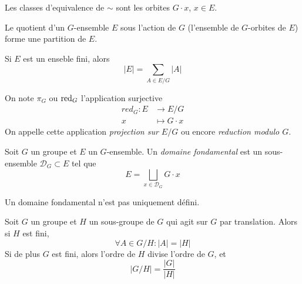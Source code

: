 \begin{remark}
	Les classes d'equivalence de $\sim$ sont les orbites $G \cdot x$, $x \in E$.
\end{remark}

\begin{corollary}
	Le quotient d'un $G$-ensemble $E$ sous l'action de $G$
	(l'ensemble de $G$-orbites de $E$) forme une partition de $E$.
\end{corollary}

\begin{corollary}
	Si $E$ est un enseble fini, alors
	\begin{equation*}
		|E| = \sum_{A \in E/G}|A|
	\end{equation*}
\end{corollary}

\begin{definition}
	On note $\pi_G$ ou $\operatorname{red}_G$ l'application surjective
	\begin{align*}
		red_G : E &\to E/G \\
		x &\mapsto G \cdot x
	\end{align*}
	On appelle cette application \emph{projection sur $E/G$} ou encore
	\emph{reduction modulo $G$}.
\end{definition}

\begin{definition}
	Soit $G$ un groupe et $E$ un $G$-ensemble.
	Un \emph{domaine fondamental} est un sous-ensemble
	$\mathcal{D}_G \subset E$ tel que
	\begin{equation*}
		E = \bigsqcup_{x \in \mathcal{D}_G} G \cdot x
	\end{equation*}
\end{definition}

\begin{remark}
	Un domaine fondamental n'est pas uniquement défini.
\end{remark}

\begin{theorem}
	Soit $G$ un groupe et $H$ un sous-groupe de $G$
	qui agit sur $G$ par translation. Alors si $H$ est fini,
	\begin{equation*}
		\forall A \in G/H: |A| = |H|
	\end{equation*}
	Si de plus $G$ est fini, alors l'ordre de $H$ divise l'ordre de $G$,
	et 
	\begin{equation*}
		|G/H| = \frac{|G|}{|H|}
	\end{equation*}
\end{theorem}

